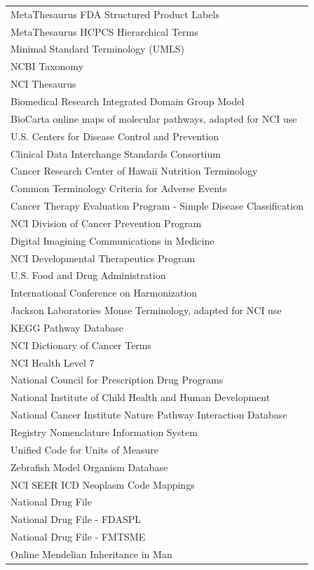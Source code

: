 \documentclass[Report.tex]{subfiles}
\begin{document}
\begin{longtable}{| p{} |}
MetaThesaurus FDA Structured Product Labels\\
MetaThesaurus HCPCS Hierarchical Terms\\
Minimal Standard Terminology (UMLS)\\
NCBI Taxonomy\\
NCI Thesaurus\\
Biomedical Research Integrated Domain Group Model\\
BioCarta online maps of molecular pathways, adapted for NCI use\\
U.S. Centers for Disease Control and Prevention\\
Clinical Data Interchange Standards Consortium\\
Cancer Research Center of Hawaii Nutrition Terminology\\
Common Terminology Criteria for Adverse Events\\
Cancer Therapy Evaluation Program - Simple Disease Classification\\
NCI Division of Cancer Prevention Program\\
Digital Imagining Communications in Medicine\\
NCI Developmental Therapeutics Program\\
U.S. Food and Drug Administration\\
International Conference on Harmonization\\
Jackson Laboratories Mouse Terminology, adapted for NCI use\\
KEGG Pathway Database\\
NCI Dictionary of Cancer Terms\\
NCI Health Level 7\\
National Council for Prescription Drug Programs\\
National Institute of Child Health and Human Development\\
National Cancer Institute Nature Pathway Interaction Database\\
Registry Nomenclature Information System\\
Unified Code for Units of Measure\\
Zebrafish Model Organism Database\\
NCI SEER ICD Neoplasm Code Mappings\\
National Drug File\\
National Drug File - FDASPL\\
National Drug File - FMTSME\\
Online Mendelian Inheritance in Man\\

\end{longtable}
\end{document}
